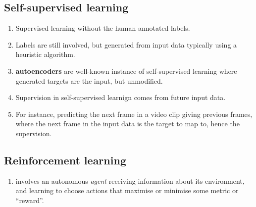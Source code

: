 \documentclass[12pt, a4paper]{article}
\begin{document}
\subsection{Self-supervised learning}
\begin{enumerate}
   \item Supervised learning without the human annotated labels.
   \item Labels are still involved, but generated from input data typically using 
   a heuristic algorithm.
   \item \textbf{autoencoders} are well-known instance of self-supervised learning
   where generated targets are the input, but unmodified.
   \item Supervision in self-supervised learnign comes from future input data.
   \item For instance, predicting the next frame in a video clip giving previous frames, where
   the next frame in the input data is the target to map to, hence the supervision.
\end{enumerate}

\subsection{Reinforcement learning}
\begin{enumerate}
   \item involves an autonomous \textit{agent} receiving information about its
   environment, and learning to choose actions that maximise or minimise some metric
   or ``reward''.
\end{enumerate}
\end{document}
